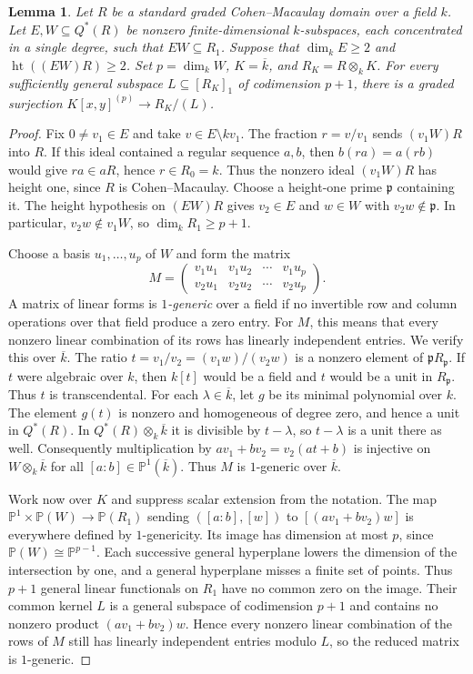 \documentclass[a4paper,11pt]{amsart}
\DeclareMathOperator{\height}{ht}
\newcommand{\kk}{k}
\newtheorem{lemma}[theorem]{Lemma}
\theoremstyle{definition}
\begin{document}
\begin{lemma}\label{lem:product-matrix}
Let $R$ be a standard graded Cohen--Macaulay domain over a field $\kk$. Let $E,W\subseteq Q^*(R)$ be nonzero finite-dimensional $\kk$-subspaces, each concentrated in a single degree, such that $EW\subseteq R_1$. Suppose that $\dim_{\kk}E\geq2$ and $\height((EW)R)\geq2$. Set $p=\dim_{\kk}W$, $K=\overline{\kk}$, and $R_K=R\otimes_{\kk}K$. For every sufficiently general subspace $L\subseteq [R_K]_1$ of codimension $p+1$, there is a graded surjection $K[x,y]^{(p)}\to R_K/(L)$.
\end{lemma}
\begin{proof}
Fix $0\ne v_1\in E$ and take $v\in E\setminus\kk v_1$. The fraction $r=v/v_1$ sends $(v_1W)R$ into $R$. If this ideal contained a regular sequence $a,b$, then $b(ra)=a(rb)$ would give $ra\in aR$, hence $r\in R_0=\kk$. Thus the nonzero ideal $(v_1W)R$ has height one, since $R$ is Cohen--Macaulay. Choose a height-one prime $\mathfrak p$ containing it. The height hypothesis on $(EW)R$ gives $v_2\in E$ and $w\in W$ with $v_2w\notin\mathfrak p$. In particular, $v_2w\notin v_1W$, so $\dim_{\kk}R_1\geq p+1$.

Choose a basis $u_1,\ldots,u_p$ of $W$ and form the matrix
\[
 M=\begin{pmatrix}v_1u_1&v_1u_2&\cdots&v_1u_p\\v_2u_1&v_2u_2&\cdots&v_2u_p\end{pmatrix}.
\]
A matrix of linear forms is \emph{$1$-generic} over a field if no invertible row and column operations over that field produce a zero entry. For $M$, this means that every nonzero linear combination of its rows has linearly independent entries. We verify this over $\overline{\kk}$. The ratio $t=v_1/v_2=(v_1w)/(v_2w)$ is a nonzero element of $\mathfrak pR_{\mathfrak p}$. If $t$ were algebraic over $\kk$, then $\kk[t]$ would be a field and $t$ would be a unit in $R_{\mathfrak p}$. Thus $t$ is transcendental. For each $\lambda\in\overline{\kk}$, let $g$ be its minimal polynomial over $\kk$. The element $g(t)$ is nonzero and homogeneous of degree zero, and hence a unit in $Q^*(R)$. In $Q^*(R)\otimes_{\kk}\overline{\kk}$ it is divisible by $t-\lambda$, so $t-\lambda$ is a unit there as well. Consequently multiplication by $av_1+bv_2=v_2(at+b)$ is injective on $W\otimes_{\kk}\overline{\kk}$ for all $[a:b]\in\mathbb P^1(\overline{\kk})$. Thus $M$ is $1$-generic over $\overline{\kk}$.

Work now over $K$ and suppress scalar extension from the notation. The map $\mathbb P^1\times\mathbb P(W)\to\mathbb P(R_1)$ sending $([a:b],[w])$ to $[(av_1+bv_2)w]$ is everywhere defined by $1$-genericity. Its image has dimension at most $p$, since $\mathbb P(W)\cong\mathbb P^{p-1}$. Each successive general hyperplane lowers the dimension of the intersection by one, and a general hyperplane misses a finite set of points. Thus $p+1$ general linear functionals on $R_1$ have no common zero on the image. Their common kernel $L$ is a general subspace of codimension $p+1$ and contains no nonzero product $(av_1+bv_2)w$. Hence every nonzero linear combination of the rows of $M$ still has linearly independent entries modulo $L$, so the reduced matrix is $1$-generic.


\end{proof}
\end{document}
